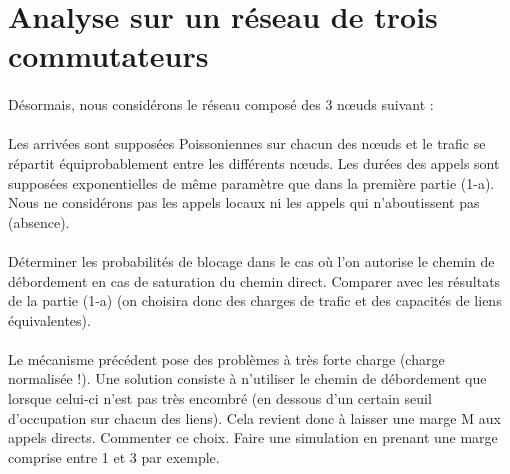     \clearpage


    \section{Analyse sur un réseau de trois commutateurs}

        \paragraph{}
        Désormais, nous considérons le réseau composé des 3 nœuds suivant :
        
        \paragraph{}
        Les arrivées sont supposées Poissoniennes sur chacun des nœuds et le trafic se répartit équiprobablement entre les différents nœuds. Les durées des appels sont supposées exponentielles de même paramètre que dans la première partie (1-a). Nous ne considérons pas les appels locaux ni les appels qui n'aboutissent pas (absence).

        \paragraph{}
        Déterminer les probabilités de blocage dans le cas où l'on autorise le chemin de débordement en cas de saturation du chemin direct. Comparer avec les résultats de la partie (1-a) (on choisira donc des charges de trafic et des capacités de liens équivalentes).

        \paragraph{}
        Le mécanisme précédent pose des problèmes à très forte charge (charge normalisée !). Une solution consiste à n'utiliser le chemin de débordement que lorsque celui-ci n'est pas très encombré (en dessous d'un certain seuil d'occupation sur chacun des liens). Cela revient donc à laisser une marge M aux appels directs. Commenter ce choix. Faire une simulation en prenant une marge comprise entre 1 et 3 par exemple.

    \clearpage
